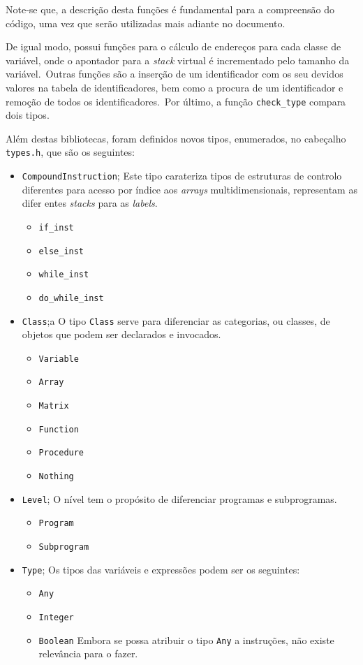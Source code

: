 Note-se que, a descrição desta funções é fundamental para a compreensão do
código, uma vez que serão utilizadas mais adiante no documento.

De igual modo, possui funções para o cálculo de endereços para cada classe de
variável, onde o apontador para a \emph{stack} virtual é incrementado pelo
tamanho da variável.\ Outras funções são a inserção de um identificador com os
seu devidos valores na tabela de identificadores, bem como a procura de um
identificador e remoção de todos os identificadores.\ Por último, a função
\texttt{check\_type} compara dois tipos.\  

Além destas bibliotecas, foram definidos novos tipos, enumerados,  no cabeçalho
\texttt{types.h}, que são os seguintes:


\begin{itemize}
	\item \verb|CompoundInstruction|;
Este tipo carateriza tipos de estruturas de controlo diferentes para acesso por
índice aos \emph{arrays} multidimensionais, representam as difer
entes
\emph{stacks} para as \emph{labels}.   

		\begin{itemize}
			\item \texttt{if\_inst}
			\item \texttt{else\_inst}
			\item \texttt{while\_inst}
			\item \texttt{do\_while\_inst}
		\end{itemize}
	\item \verb|Class|;a
		O tipo \texttt{Class} serve para diferenciar as categorias, ou classes, de
		objetos que podem ser declarados e invocados.
		\begin{itemize}
			\item \texttt{Variable}
			\item \texttt{Array}
			\item \texttt{Matrix}
			\item \texttt{Function}
			\item \texttt{Procedure}
			\item \texttt{Nothing}
		\end{itemize}
	\item \verb|Level|;
		O nível tem o propósito de diferenciar programas e subprogramas.
		\begin{itemize}
			\item \texttt{Program}
			\item \texttt{Subprogram}
		\end{itemize}
	\item \verb|Type|;
		Os tipos das variáveis e expressões podem ser os seguintes:
		\begin{itemize}
			\item \texttt{Any}
			\item \texttt{Integer}
			\item \texttt{Boolean}
				Embora se possa atribuir o tipo \texttt{Any} a instruções, não existe
				relevância para o fazer. 
		\end{itemize}
\end{itemize}


